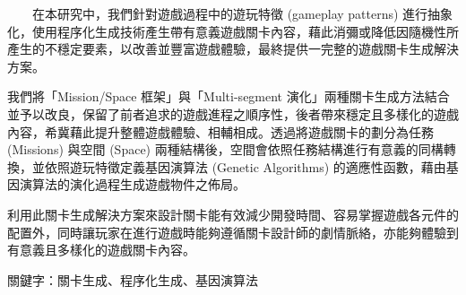 　　在本研究中，我們針對遊戲過程中的遊玩特徵 (gameplay patterns) 進行抽象化，使用程序化生成技術產生帶有意義遊戲關卡內容，藉此消彌或降低因隨機性所產生的不穩定要素，以改善並豐富遊戲體驗，最終提供一完整的遊戲關卡生成解決方案。

我們將「Mission/Space 框架」與「Multi-segment 演化」兩種關卡生成方法結合並予以改良，保留了前者追求的遊戲進程之順序性，後者帶來穩定且多樣化的遊戲內容，希冀藉此提升整體遊戲體驗、相輔相成。透過將遊戲關卡的劃分為任務 (Missions) 與空間 (Space) 兩種結構後，空間會依照任務結構進行有意義的同構轉換，並依照遊玩特徵定義基因演算法 (Genetic Algorithms) 的適應性函數，藉由基因演算法的演化過程生成遊戲物件之佈局。

利用此關卡生成解決方案來設計關卡能有效減少開發時間、容易掌握遊戲各元件的配置外，同時讓玩家在進行遊戲時能夠遵循關卡設計師的劇情脈絡，亦能夠體驗到有意義且多樣化的遊戲關卡內容。

關鍵字：關卡生成、程序化生成、基因演算法 